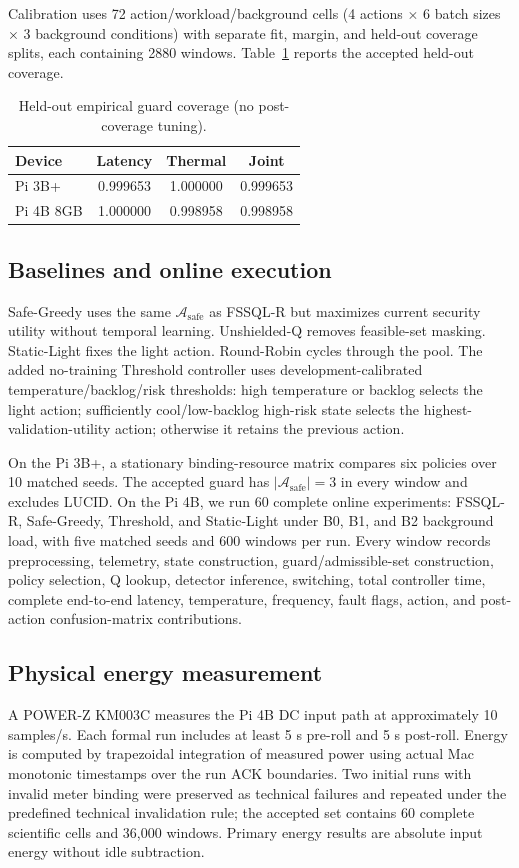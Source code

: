 \documentclass[journal]{IEEEtran}
\newcommand{\Asafe}{\mathcal{A}_{\mathrm{safe}}}
\begin{document}
Calibration uses 72 action/workload/background cells (4 actions $\times$ 6 batch sizes $\times$ 3 background conditions) with separate fit, margin, and held-out coverage splits, each containing 2880 windows. Table~\ref{tab:coverage} reports the accepted held-out coverage.

\begin{table}[t]
\caption{Held-out empirical guard coverage (no post-coverage tuning).}
\label{tab:coverage}
\centering\footnotesize
\begin{tabular}{lccc}
\toprule
Device & Latency & Thermal & Joint \\
\midrule
Pi 3B+ & 0.999653 & 1.000000 & 0.999653 \\
Pi 4B 8GB & 1.000000 & 0.998958 & 0.998958 \\
\bottomrule
\end{tabular}
\end{table}

\subsection{Baselines and online execution}
Safe-Greedy uses the same $\Asafe$ as FSSQL-R but maximizes current security utility without temporal learning. Unshielded-Q removes feasible-set masking. Static-Light fixes the light action. Round-Robin cycles through the pool. The added no-training Threshold controller uses development-calibrated temperature/backlog/risk thresholds: high temperature or backlog selects the light action; sufficiently cool/low-backlog high-risk state selects the highest-validation-utility action; otherwise it retains the previous action.

On the Pi 3B+, a stationary binding-resource matrix compares six policies over 10 matched seeds. The accepted guard has $|\Asafe|=3$ in every window and excludes LUCID. On the Pi 4B, we run 60 complete online experiments: FSSQL-R, Safe-Greedy, Threshold, and Static-Light under B0, B1, and B2 background load, with five matched seeds and 600 windows per run. Every window records preprocessing, telemetry, state construction, guard/admissible-set construction, policy selection, Q lookup, detector inference, switching, total controller time, complete end-to-end latency, temperature, frequency, fault flags, action, and post-action confusion-matrix contributions.

\subsection{Physical energy measurement}
A POWER-Z KM003C measures the Pi 4B DC input path at approximately 10 samples/s. Each formal run includes at least 5 s pre-roll and 5 s post-roll. Energy is computed by trapezoidal integration of measured power using actual Mac monotonic timestamps over the run ACK boundaries. Two initial runs with invalid meter binding were preserved as technical failures and repeated under the predefined technical invalidation rule; the accepted set contains 60 complete scientific cells and 36,000 windows. Primary energy results are absolute input energy without idle subtraction.
\end{document}
